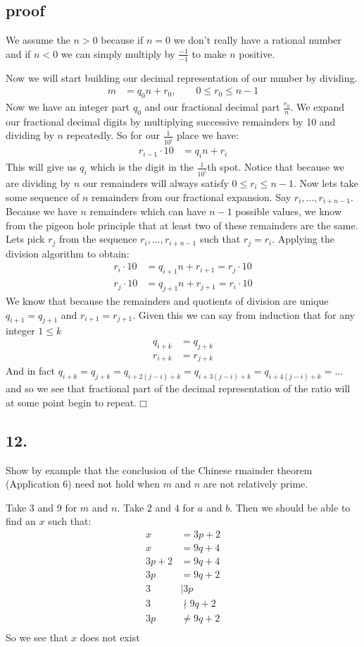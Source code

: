 \documentclass{article}
\begin{document}
\subsection*{proof}
We assume the $n>0$ because if $n=0$ we don't really have a rational number and if $n<0$ we can simply multiply by $\frac{-1}{-1}$ to make $n$ positive.

Now we will start building our decimal representation of our number by dividing.
\begin{align*}
  m&=q_0n+r_0,\qquad 0\le r_0\le n-1
\end{align*}
Now we have an integer part $q_0$ and our fractional decimal part $\frac{r_0}{n}$. We expand our fractional decimal digits by multiplying successive remainders by 10 and dividing by $n$ repeatedly. So for our $\frac{1}{10^i}$ place we have:
\begin{align*}
  r_{i-1}\cdot10&=q_in+r_i
\end{align*}
This will give us $q_i$ which is the digit in the $\frac{1}{10^i}$th spot. Notice that because we are dividing by $n$ our remainders will always satisfy $0\le r_i\le n-1$. Now lets take some sequence of $n$ remainders from our fractional expansion. Say $r_i,\dots,r_{i+n-1}$. Because we have $n$ remainders which can have $n-1$ possible values, we know from the pigeon hole principle that at least two of these remainders are the same. Lets pick $r_j$ from the sequence $r_i,\dots,r_{i+n-1}$ such that $r_j=r_i$. Applying the division algorithm to obtain:
\begin{align*}
  r_{i}\cdot10&=q_{i+1}n+r_{i+1}=r_{j}\cdot10\\
  r_{j}\cdot10&=q_{j+1}n+r_{j+1}=r_{i}\cdot10
\end{align*}
We know that because the remainders and quotients of division are unique $q_{i+1}=q_{j+1}$ and $r_{i+1}=r_{j+1}$. Given this we can say from induction that for any integer $1\le k$
\begin{align*}
  q_{i+k}&=q_{j+k}\\
  r_{i+k}&=r_{j+k}
\end{align*}
And in fact $q_{i+k}=q_{j+k}=q_{i+2(j-i)+k}=q_{i+3(j-i)+k}=q_{i+4(j-i)+k}=\dots$ and so we see that fractional part of the decimal representation of the ratio will at some point begin to repeat.$\Box$
\subsection*{12.}
Show by example that the conclusion of the Chinese rmainder theorem (Application 6) need not hold when $m$ and $n$ are not relatively prime.

Take 3 and 9 for $m$ and $n$. Take $2$ and $4$ for $a$ and $b$. Then we should be able to find an $x$ such that:
\begin{align*}
  x&=3p+2\\
  x&=9q+4\\
  3p+2&=9q+4\\
  3p&=9q+2\\
  3&\mid 3p\\
  3&\nmid 9q+2\\
  3p&\neq9q+2\\
\end{align*}
So we see that $x$ does not exist
\end{document}
